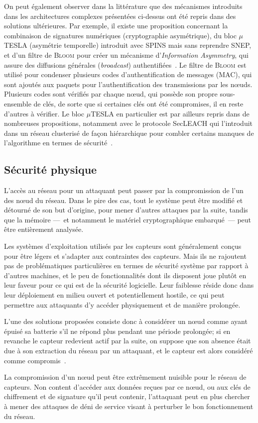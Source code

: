 On peut également observer dans la littérature que des mécanismes introduits dans les architectures complexes présentées ci-dessus ont été repris dans des solutions ultérieures.
Par exemple, il existe une proposition concernant la combinaison de signatures numériques (cryptographie asymétrique), du bloc $\mu$TESLA (asymétrie temporelle) introduit avec SPINS mais sans reprendre SNEP, et d'un filtre de \textsc{Bloom} pour créer un mécanisme d'\textit{Information Asymmetry}, qui assure des diffusions générales (\textit{broadcast}) authentifiées~\cite{SLS10}.
Le filtre de \textsc{Bloom} est utilisé pour condenser plusieurs codes d'authentification de messages (MAC), qui sont ajoutés aux paquets pour l'authentification des transmissions par les nœuds.
Plusieurs codes sont vérifiés par chaque nœud, qui possède son propre sous-ensemble de clés, de sorte que si certaines clés ont été compromises, il en reste d'autres à vérifier.
Le bloc $\mu$TESLA en particulier est par ailleurs repris dans de nombreuses propositions, notamment avec le protocole SecLEACH qui l'introduit dans un réseau clusterisé de façon hiérarchique pour combler certains manques de l'algorithme \leach en termes de sécurité~\cite{OFVWBDL07}.

\subsection{Sécurité physique}

L'accès au réseau pour un attaquant peut passer par la compromission de l'un des nœud du réseau.
Dans le pire des cas, tout le système peut être modifié et détourné de son but d'origine, pour mener d'autres attaques par la suite, tandis que la mémoire ---~et notamment le matériel cryptographique embarqué~--- peut être entièrement analysée.

Les systèmes d'exploitation utilisés par les capteurs sont généralement conçus pour être légers et s'adapter aux contraintes des capteurs.
Mais ils ne rajoutent pas de problématiques particulières en termes de sécurité système par rapport à d'autres machines, et le peu de fonctionnalités dont ils disposent joue plutôt en leur faveur pour ce qui est de la sécurité logicielle.
Leur faiblesse réside donc dans leur déploiement en milieu ouvert et potentiellement hostile, ce qui peut permettre aux attaquants d'y accéder physiquement et de manière prolongée.

L'une des solutions proposées consiste donc à considérer un nœud comme ayant épuisé sa batterie s'il ne répond plus pendant une période prolongée; si en revanche le capteur redevient actif par la suite, on suppose que son absence était due à son extraction du réseau par un attaquant, et le capteur est alors considéré comme compromis~\cite{Ho10}.

La compromission d'un nœud peut être extrêmement nuisible pour le réseau de capteurs.
Non content d'accéder aux données reçues par ce nœud, ou aux clés de chiffrement et de signature qu'il peut contenir, l'attaquant peut en plus chercher à mener des attaques de déni de service visant à perturber le bon fonctionnement du réseau.
